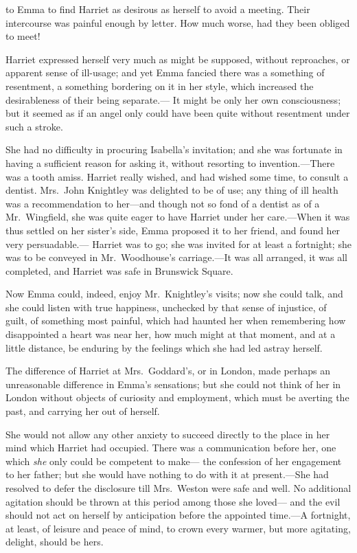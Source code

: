  to Emma to find Harriet as desirous
as herself to avoid a meeting.  Their intercourse was painful
enough by letter.  How much worse, had they been obliged to meet!

Harriet expressed herself very much as might be supposed,
without reproaches, or apparent sense of ill-usage; and yet Emma fancied
there was a something of resentment, a something bordering on it in
her style, which increased the desirableness of their being separate.---%
It might be only her own consciousness; but it seemed as if an
angel only could have been quite without resentment under such a stroke.

She had no difficulty in procuring Isabella's invitation;
and she was fortunate in having a sufficient reason for asking it,
without resorting to invention.---There was a tooth amiss.
Harriet really wished, and had wished some time, to consult a dentist.
Mrs.\ John Knightley was delighted to be of use; any thing of ill
health was a recommendation to her---and though not so fond of a
dentist as of a Mr.\ Wingfield, she was quite eager to have Harriet
under her care.---When it was thus settled on her sister's side,
Emma proposed it to her friend, and found her very persuadable.---%
Harriet was to go; she was invited for at least a fortnight; she was
to be conveyed in Mr.\ Woodhouse's carriage.---It was all arranged,
it was all completed, and Harriet was safe in Brunswick Square.

Now Emma could, indeed, enjoy Mr.\ Knightley's visits; now she
could talk, and she could listen with true happiness, unchecked by
that sense of injustice, of guilt, of something most painful,
which had haunted her when remembering how disappointed a heart was
near her, how much might at that moment, and at a little distance,
be enduring by the feelings which she had led astray herself.

The difference of Harriet at Mrs.\ Goddard's, or in London, made perhaps
an unreasonable difference in Emma's sensations; but she could not
think of her in London without objects of curiosity and employment,
which must be averting the past, and carrying her out of herself.

She would not allow any other anxiety to succeed directly to the place
in her mind which Harriet had occupied.  There was a communication
before her, one which \emph{she} only could be competent to make---%
the confession of her engagement to her father; but she would
have nothing to do with it at present.---She had resolved to defer
the disclosure till Mrs.\ Weston were safe and well.  No additional
agitation should be thrown at this period among those she loved---%
and the evil should not act on herself by anticipation before the
appointed time.---A fortnight, at least, of leisure and peace of mind,
to crown every warmer, but more agitating, delight, should be hers.

